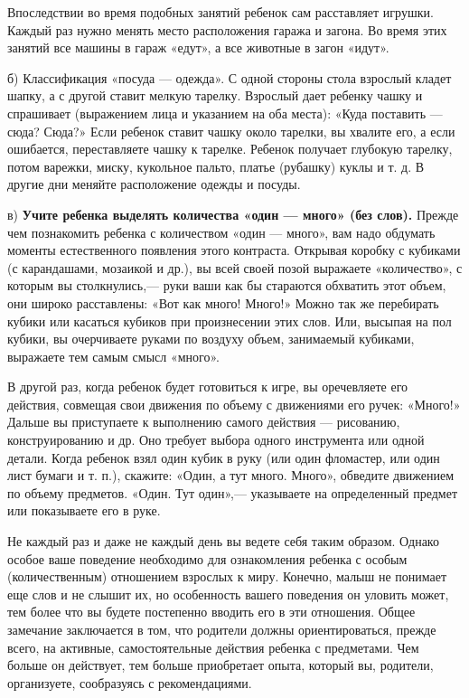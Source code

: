 \documentclass[a5paper]{book}
\begin{document}
Впоследствии во время подобных занятий ребенок сам расставляет игрушки.
Каждый раз нужно менять место расположения гаража и загона. Во время
этих занятий все машины в гараж «едут», а все животные в загон «идут».

б) Классификация «посуда --- одежда». С одной стороны стола взрослый
кладет шапку, а с другой ставит мелкую тарелку. Взрослый дает ребенку
чашку и спрашивает (выражением лица и указанием на оба места): «Куда
поставить --- сюда? Сюда?» Если ребенок ставит чашку около тарелки, вы
хвалите его, а если ошибается, переставляете чашку к тарелке. Ребенок
получает глубокую тарелку, потом варежки, миску, кукольное пальто,
платье (рубашку) куклы и т. д. В другие дни меняйте расположение одежды
и посуды.

в) \textbf{Учите ребенка выделять количества «один --- много» (без
слов).} Прежде чем познакомить ребенка с количеством «один --- много»,
вам надо обдумать моменты естественного появления этого контраста.
Открывая коробку с кубиками (с карандашами, мозаикой и др.), вы всей
своей позой выражаете «количество», с которым вы столкнулись,--- руки
ваши как бы стараются обхватить этот объем, они широко расставлены: «Вот
как много! Много!» Можно так же перебирать кубики или касаться кубиков
при произнесении этих слов. Или, высыпая на пол кубики, вы очерчиваете
руками по воздуху объем, занимаемый кубиками, выражаете тем самым смысл
«много».

В другой раз, когда ребенок будет готовиться к игре, вы оречевляете его
действия, совмещая свои движения по объему с движениями его ручек:
«Много!» Дальше вы приступаете к выполнению самого действия ---
рисованию, конструированию и др. Оно требует выбора одного инструмента
или одной детали. Когда ребенок взял один кубик в руку (или один
фломастер, или один лист бумаги и т. п.), скажите: «Один, а тут много.
Много», обведите движением по объему предметов. «Один. Тут один»,---
указываете на определенный предмет или показываете его в руке.

Не каждый раз и даже не каждый день вы ведете себя таким образом. Однако
особое ваше поведение необходимо для ознакомления ребенка с особым
(количественным) отношением взрослых к миру. Конечно, малыш не понимает
еще слов и не слышит их, но особенность вашего поведения он уловить
может, тем более что вы будете постепенно вводить его в эти отношения.
Общее замечание заключается в том, что родители должны ориентироваться,
прежде всего, на активные, самостоятельные действия ребенка с
предметами. Чем больше он действует, тем больше приобретает опыта,
который вы, родители, организуете, сообразуясь с рекомендациями.
\end{document}
